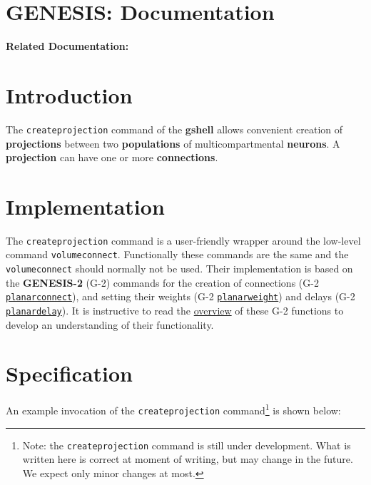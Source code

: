 \documentclass[12pt]{article}
\begin{document}
\section*{GENESIS: Documentation}

{\bf Related Documentation:} \\

\section*{Introduction}

The {\tt createprojection} command of the {\bf gshell} allows
convenient creation of {\bf projections} between two {\bf populations}
of multicompartmental {\bf neurons}.  A {\bf projection} can have one
or more {\bf connections}.

\section*{Implementation}

The {\tt createprojection} command is a user-friendly wrapper around
the low-level command {\tt volumeconnect}.  Functionally these
commands are the same and the {\tt volumeconnect} should normally not
be used.  Their implementation is based on the {\bf GENESIS-2} (G-2)
commands for the creation of connections (G-2
\href{http://www.genesis-sim.org/GENESIS/UGTD/Tutorials/genprog/textDoc/planarconnect.doc.txt}{
  {\tt planarconnect}}), and setting their weights (G-2
\href{http://www.genesis-sim.org/GENESIS/UGTD/Tutorials/genprog/textDoc/planarweight.doc.txt}{
  {\tt planarweight}}) and delays (G-2
\href{http://www.genesis-sim.org/GENESIS/UGTD/Tutorials/genprog/textDoc/planardelay.doc.txt}{
  {\tt planardelay}}).  It is instructive to read the
\href{http://www.genesis-sim.org/GENESIS/UGTD/Tutorials/genprog/net-tut.html}{overview}
of these G-2 functions to develop an understanding of their
functionality.


\section*{Specification}

An example invocation of the {\tt createprojection}
command\footnote{Note: the {\tt createprojection} command is still
  under development.  What is written here is correct at moment of
  writing, but may change in the future.  We expect only minor changes
  at most.} is shown below:
\end{document}
